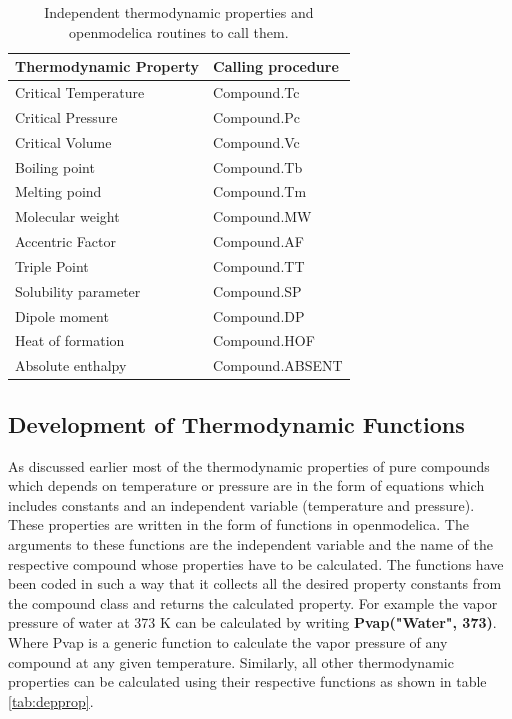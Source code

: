 \documentclass[12pt]{report}
\begin{document}
\begin{table}
\centering
\caption {Independent thermodynamic properties and openmodelica routines to call them.}
\label{tab:indprop}
\vspace{1ex}
\begin{tabular}{l|l} \hline
Thermodynamic Property & Calling procedure \\ \hline
Critical Temperature & Compound.Tc \\
Critical Pressure & Compound.Pc \\
Critical Volume & Compound.Vc \\
Boiling point & Compound.Tb \\
Melting poind & Compound.Tm \\
Molecular weight & Compound.MW \\
Accentric Factor & Compound.AF \\
Triple Point & Compound.TT \\
Solubility parameter & Compound.SP \\ 
Dipole moment & Compound.DP \\ 
Heat of formation & Compound.HOF \\ 
Absolute enthalpy & Compound.ABSENT \\ \hline
\end{tabular}
\end{table}

\subsection{Development of Thermodynamic Functions}

As discussed earlier most of the thermodynamic properties of pure compounds which depends on temperature or pressure are in the form of equations which includes constants and an independent variable (temperature and pressure). These properties are written in the form of functions in openmodelica. The arguments to these functions are the independent variable and the name of the respective compound whose properties have to be calculated. The functions have been coded in such a way that it collects all the desired property constants from the compound class and returns the calculated property. For example the vapor pressure of water at 373 K can be calculated by writing \textbf{Pvap("Water", 373)}. Where Pvap is a generic function to calculate the vapor pressure of any compound at any given temperature. Similarly, all other thermodynamic properties can be calculated using their respective functions as shown in table \ref{tab:depprop}.
\end{document}
